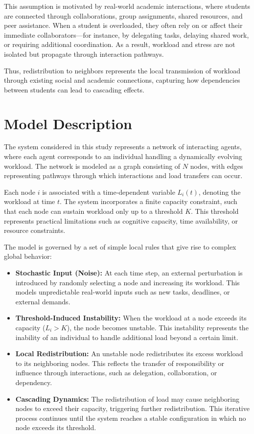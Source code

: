\documentclass[12pt]{article}
\begin{document}
This assumption is motivated by real-world academic interactions, where students are connected through collaborations, group assignments, shared resources, and peer assistance. When a student is overloaded, they often rely on or affect their immediate collaborators—for instance, by delegating tasks, delaying shared work, or requiring additional coordination. As a result, workload and stress are not isolated but propagate through interaction pathways.

Thus, redistribution to neighbors represents the local transmission of workload through existing social and academic connections, capturing how dependencies between students can lead to cascading effects.


\section{Model Description}

The system considered in this study represents a network of interacting agents, where each agent corresponds to an individual handling a dynamically evolving workload. The network is modeled as a graph consisting of $N$ nodes, with edges representing pathways through which interactions and load transfers can occur.

Each node $i$ is associated with a time-dependent variable $L_i(t)$, denoting the workload at time $t$. The system incorporates a finite capacity constraint, such that each node can sustain workload only up to a threshold $K$. This threshold represents practical limitations such as cognitive capacity, time availability, or resource constraints.

The model is governed by a set of simple local rules that give rise to complex global behavior:

\begin{itemize}
\item \textbf{Stochastic Input (Noise):} At each time step, an external perturbation is introduced by randomly selecting a node and increasing its workload. This models unpredictable real-world inputs such as new tasks, deadlines, or external demands.

\item \textbf{Threshold-Induced Instability:} When the workload at a node exceeds its capacity ($L_i > K$), the node becomes unstable. This instability represents the inability of an individual to handle additional load beyond a certain limit.

\item \textbf{Local Redistribution:} An unstable node redistributes its excess workload to its neighboring nodes. This reflects the transfer of responsibility or influence through interactions, such as delegation, collaboration, or dependency.

\item \textbf{Cascading Dynamics:} The redistribution of load may cause neighboring nodes to exceed their capacity, triggering further redistribution. This iterative process continues until the system reaches a stable configuration in which no node exceeds its threshold.


\end{itemize}
\end{document}

